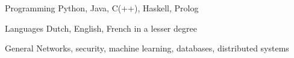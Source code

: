 


\begin{cvskills}


\cvskill
{Programming} %
{Python, Java, C(++), Haskell, Prolog} %


\cvskill
{Languages} %
{Dutch, English, French in a lesser degree} %


\cvskill
{General} %
{Networks, security, machine learning, databases, distributed systems} %

\end{cvskills}